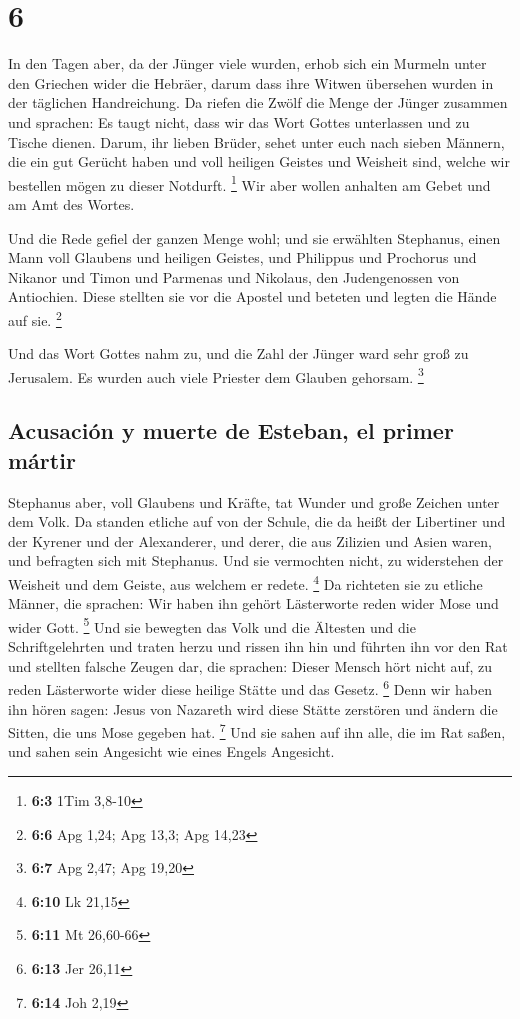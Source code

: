 \hypertarget{section-5}{%
\section{6}\label{section-5}}

 In den Tagen aber, da der Jünger viele wurden, erhob sich
ein Murmeln unter den Griechen wider die Hebräer, darum dass ihre Witwen
übersehen wurden in der täglichen Handreichung.  Da riefen
die Zwölf die Menge der Jünger zusammen und sprachen: Es taugt nicht,
dass wir das Wort Gottes unterlassen und zu Tische dienen.
 Darum, ihr lieben Brüder, sehet unter euch nach sieben
Männern, die ein gut Gerücht haben und voll heiligen Geistes und
Weisheit sind, welche wir bestellen mögen zu dieser Notdurft.
\footnote{\textbf{6:3} 1Tim 3,8-10}  Wir aber wollen
anhalten am Gebet und am Amt des Wortes.

 Und die Rede gefiel der ganzen Menge wohl; und sie
erwählten Stephanus, einen Mann voll Glaubens und heiligen Geistes, und
Philippus und Prochorus und Nikanor und Timon und Parmenas und Nikolaus,
den Judengenossen von Antiochien.  Diese stellten sie vor
die Apostel und beteten und legten die Hände auf sie. \footnote{\textbf{6:6}
  Apg 1,24; Apg 13,3; Apg 14,23}

 Und das Wort Gottes nahm zu, und die Zahl der Jünger ward
sehr groß zu Jerusalem. Es wurden auch viele Priester dem Glauben
gehorsam. \footnote{\textbf{6:7} Apg 2,47; Apg 19,20}

\hypertarget{acusaciuxf3n-y-muerte-de-esteban-el-primer-muxe1rtir}{%
\subsection{Acusación y muerte de Esteban, el primer
mártir}\label{acusaciuxf3n-y-muerte-de-esteban-el-primer-muxe1rtir}}

 Stephanus aber, voll Glaubens und Kräfte, tat Wunder und
große Zeichen unter dem Volk.  Da standen etliche auf von
der Schule, die da heißt der Libertiner und der Kyrener und der
Alexanderer, und derer, die aus Zilizien und Asien waren, und befragten
sich mit Stephanus.  Und sie vermochten nicht, zu
widerstehen der Weisheit und dem Geiste, aus welchem er redete.
\footnote{\textbf{6:10} Lk 21,15}  Da richteten sie zu
etliche Männer, die sprachen: Wir haben ihn gehört Lästerworte reden
wider Mose und wider Gott. \footnote{\textbf{6:11} Mt 26,60-66}
 Und sie bewegten das Volk und die Ältesten und die
Schriftgelehrten und traten herzu und rissen ihn hin und führten ihn vor
den Rat  und stellten falsche Zeugen dar, die sprachen:
Dieser Mensch hört nicht auf, zu reden Lästerworte wider diese heilige
Stätte und das Gesetz. \footnote{\textbf{6:13} Jer 26,11}
 Denn wir haben ihn hören sagen: Jesus von Nazareth wird
diese Stätte zerstören und ändern die Sitten, die uns Mose gegeben hat.
\footnote{\textbf{6:14} Joh 2,19}  Und sie sahen auf ihn
alle, die im Rat saßen, und sahen sein Angesicht wie eines Engels
Angesicht.

